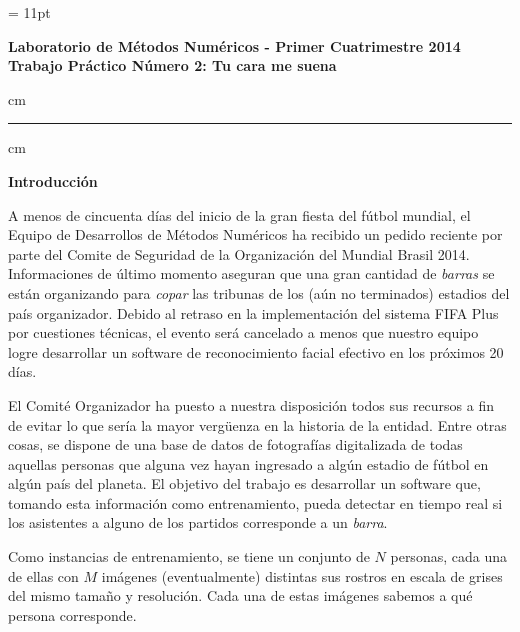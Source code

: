 
\parskip = 11pt

\newcommand{\real}{\mathbb{R}}

%


\begin{centering}
\large\bf Laboratorio de M\'etodos Num\'ericos - Primer Cuatrimestre 2014 \\
\large\bf Trabajo Pr\'actico N\'umero 2: Tu cara me suena\\
\end{centering}


 cm
\hrule
{} cm

{\bf\noindent Introducci\'on}

A menos de cincuenta d\'ias del inicio de la gran fiesta del f\'utbol mundial, el Equipo de Desarrollos de M\'etodos
Num\'ericos ha recibido un pedido reciente por parte del Comite de Seguridad de la
Organizaci\'on del Mundial Brasil 2014. Informaciones de \'ultimo momento aseguran que una gran cantidad de
\emph{barras} se est\'an organizando para \emph{copar} las tribunas de los (a\'un no terminados) estadios del pa\'is
organizador. Debido al retraso en la implementaci\'on del sistema FIFA Plus por cuestiones t\'ecnicas, el evento ser\'a
cancelado a menos que nuestro equipo logre desarrollar un software de reconocimiento facial efectivo en los pr\'oximos
20 d\'ias.

El Comit\'e Organizador ha puesto a nuestra disposici\'on todos sus recursos a fin de evitar lo que ser\'ia la mayor verg\"uenza
en la historia de la entidad. Entre otras cosas, se dispone de una base de datos de fotograf\'ias digitalizada de todas
aquellas personas que alguna vez hayan ingresado a alg\'un estadio de f\'utbol en alg\'un pa\'is del planeta. El
objetivo del trabajo es desarrollar un software que, tomando esta informaci\'on como entrenamiento, pueda detectar en
tiempo real si los asistentes a alguno de los partidos corresponde a un \emph{barra}.


Como instancias de entrenamiento, se tiene un conjunto de $N$ personas, cada una de ellas con $M$ im\'agenes
(eventualmente) distintas sus rostros en escala de grises del mismo tama\~no y resoluci\'on. Cada una de estas
im\'agenes sabemos a qu\'e persona corresponde.

